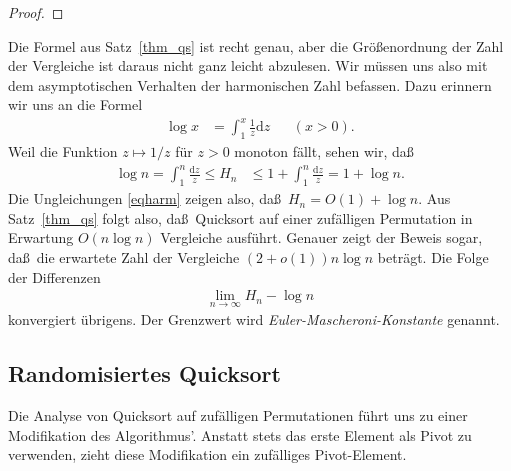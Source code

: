 \documentclass[10pt,reqno]{amsart}
\numberwithin{equation}{section}
\newcommand\vX{\vec X}
\newcommand\dd{{\mathrm d}}
\def\vec#1{\mathchoice{\mbox{\boldmath$\displaystyle#1$}}
{\mbox{\boldmath$\textstyle#1$}}
{\mbox{\boldmath$\scriptstyle#1$}}
{\mbox{\boldmath$\scriptscriptstyle#1$}}}
\DeclareMathOperator{\ex}{\mathbb E}
\DeclareMathOperator{\pr}{\mathbb P}
\newcommand\Thm{Satz}
\begin{document}
\begin{proof}
%
\end{proof}

Die Formel aus \Thm~\ref{thm_qs} ist recht genau, aber die Gr\"o\ss enordnung der Zahl der Vergleiche ist daraus nicht ganz leicht abzulesen.
Wir m\"ussen uns also mit dem asymptotischen Verhalten der harmonischen Zahl befassen.
Dazu erinnern wir uns an die Formel
\begin{align}\label{eqlog}
	\log x&=\int_1^x\frac1z\dd z&&(x>0).
\end{align}
Weil die Funktion $z\mapsto 1/z$ f\"ur $z>0$ monoton f\"allt, sehen wir, da\ss
\begin{align}\label{eqharm}
	\log n=\int_1^n\frac{\dd z}z\leq H_n&\leq1+\int_1^n\frac{\dd z}z=1+\log n.
\end{align}
Die Ungleichungen \eqref{eqharm} zeigen also, da\ss\ $H_n=O(1)+\log n$.
Aus \Thm~\ref{thm_qs} folgt also, da\ss\ Quicksort auf einer zuf\"alligen Permutation in Erwartung $O(n\log n)$ Vergleiche ausf\"uhrt.
Genauer zeigt der Beweis sogar, da\ss\ die erwartete Zahl der Vergleiche $(2+o(1))n\log n$ betr\"agt.
Die Folge der Differenzen
	\begin{align*}
		\lim_{n\to\infty}H_n-\log n
	\end{align*}
konvergiert \"ubrigens.
Der Grenzwert wird {\em Euler-Mascheroni-Konstante} genannt.

\subsection{Randomisiertes Quicksort}\label{sec_randomised_qs}
Die Analyse von Quicksort auf zuf\"alligen Permutationen f\"uhrt uns zu einer Modifikation des Algorithmus'.
Anstatt stets das erste Element als Pivot zu verwenden, zieht diese Modifikation ein zuf\"alliges Pivot-Element.
\end{document}
